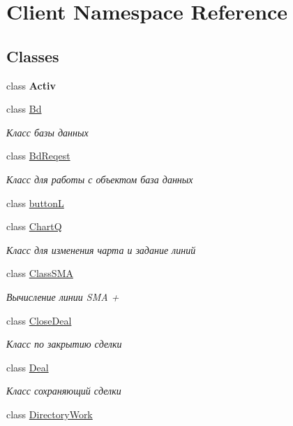 \hypertarget{namespace_client}{}\section{Client Namespace Reference}
\label{namespace_client}
\subsection*{Classes}
\begin{DoxyCompactItemize}
\item 
class {\bfseries Activ}
\item 
class \hyperlink{class_client_1_1_bd}{Bd}
\begin{DoxyCompactList}\small\item\em Класс базы данных \end{DoxyCompactList}\item 
class \hyperlink{class_client_1_1_bd_reqest}{Bd\+Reqest}
\begin{DoxyCompactList}\small\item\em Класс для работы с объектом база данных \end{DoxyCompactList}\item 
class \hyperlink{class_client_1_1button_l}{buttonL}
\item 
class \hyperlink{class_client_1_1_chart_q}{ChartQ}
\begin{DoxyCompactList}\small\item\em Класс для изменения чарта и задание линий \end{DoxyCompactList}\item 
class \hyperlink{class_client_1_1_class_s_m_a}{Class\+S\+MA}
\begin{DoxyCompactList}\small\item\em Вычисление линии S\+MA + \end{DoxyCompactList}\item 
class \hyperlink{class_client_1_1_close_deal}{Close\+Deal}
\begin{DoxyCompactList}\small\item\em Класс по закрытию сделки \end{DoxyCompactList}\item 
class \hyperlink{class_client_1_1_deal}{Deal}
\begin{DoxyCompactList}\small\item\em Класс сохраняющий сделки \end{DoxyCompactList}\item 
class \hyperlink{class_client_1_1_directory_work}{Directory\+Work}

\end{DoxyCompactItemize}
